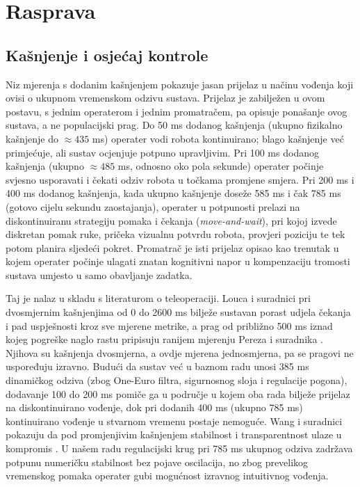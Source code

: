 \section{Rasprava}
\label{sec:rasprava}

\subsection{Kašnjenje i osjećaj kontrole}

Niz mjerenja s dodanim kašnjenjem pokazuje jasan prijelaz u načinu vođenja koji ovisi o ukupnom vremenskom odzivu sustava. Prijelaz je zabilježen u ovom postavu, s jednim operaterom i jednim promatračem, pa opisuje ponašanje ovog sustava, a ne populacijski prag. Do 50 ms dodanog kašnjenja (ukupno fizikalno kašnjenje do $\approx 435$ ms) operater vodi robota kontinuirano; blago kašnjenje već primjećuje, ali sustav ocjenjuje potpuno upravljivim. Pri 100 ms dodanog kašnjenja (ukupno $\approx 485$ ms, odnosno oko pola sekunde) operater počinje svjesno usporavati i čekati odziv robota u točkama promjene smjera. Pri 200 ms i 400 ms dodanog kašnjenja, kada ukupno kašnjenje doseže 585 ms i čak 785 ms (gotovo cijelu sekundu zaostajanja), operater u potpunosti prelazi na diskontinuiranu strategiju pomaka i čekanja (\emph{move-and-wait}), pri kojoj izvede diskretan pomak ruke, pričeka vizualnu potvrdu robota, provjeri poziciju te tek potom planira sljedeći pokret. Promatrač je isti prijelaz opisao kao trenutak u kojem operater počinje ulagati znatan kognitivni napor u kompenzaciju tromosti sustava umjesto u samo obavljanje zadatka.

Taj je nalaz u skladu s literaturom o teleoperaciji. Louca i suradnici pri dvosmjernim kašnjenjima od 0 do 2600 ms bilježe sustavan porast udjela čekanja i pad uspješnosti kroz sve mjerene metrike, a prag od približno 500 ms iznad kojeg pogreške naglo rastu pripisuju ranijem mjerenju Pereza i suradnika \cite[str.~14]{louca2024}. Njihova su kašnjenja dvosmjerna, a ovdje mjerena jednosmjerna, pa se pragovi ne uspoređuju izravno. Budući da sustav već u baznom radu unosi 385 ms dinamičkog odziva (zbog One-Euro filtra, sigurnosnog sloja i regulacije pogona), dodavanje 100 do 200 ms pomiče ga u područje u kojem oba rada bilježe prijelaz na diskontinuirano vođenje, dok pri dodanih 400 ms (ukupno 785 ms) kontinuirano vođenje u stvarnom vremenu postaje nemoguće. Wang i suradnici pokazuju da pod promjenjivim kašnjenjem stabilnost i transparentnost ulaze u kompromis \cite[str.~5]{wang2025}. U našem radu regulacijski krug pri 785 ms ukupnog odziva zadržava potpunu numeričku stabilnost bez pojave oscilacija, no zbog prevelikog vremenskog pomaka operater gubi mogućnost izravnog intuitivnog vođenja.

